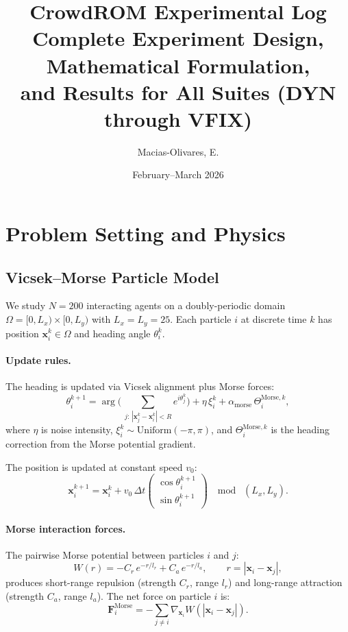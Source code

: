 \documentclass[11pt]{article}
\title{%
  \textbf{CrowdROM Experimental Log}\\[6pt]
  \large Complete Experiment Design, Mathematical Formulation,\\
  \large and Results for All Suites (DYN through VFIX)}
\author{Macias-Olivares, E.}
\date{February--March 2026}
\newcommand{\bx}{\mathbf{x}}
\begin{document}
\maketitle
\tableofcontents
\newpage


\section{Problem Setting and Physics}
\label{sec:physics}

\subsection{Vicsek--Morse Particle Model}

We study $N = 200$ interacting agents on a doubly-periodic domain
$\Omega = [0, L_x) \times [0, L_y)$ with $L_x = L_y = 25$.
Each particle $i$ at discrete time $k$ has position
$\bx_i^k \in \Omega$ and heading angle $\theta_i^k$.

\paragraph{Update rules.}
The heading is updated via Vicsek alignment plus Morse forces:
\begin{equation}\label{eq:heading}
  \theta_i^{k+1}
  = \arg\!\biggl(\,
    \sum_{j:\,|\bx_j^k - \bx_i^k| < R}
    e^{i\theta_j^k}\biggr)
  + \eta\,\xi_i^k
  + \alpha_{\text{morse}}\,\Theta_i^{\text{Morse}, k},
\end{equation}
where $\eta$ is noise intensity, $\xi_i^k \sim \text{Uniform}(-\pi, \pi)$,
and $\Theta_i^{\text{Morse},k}$ is the heading correction from
the Morse potential gradient.

The position is updated at constant speed $v_0$:
\begin{equation}
  \bx_i^{k+1} = \bx_i^k + v_0\,\Delta t
  \begin{pmatrix}\cos\theta_i^{k+1}\\\sin\theta_i^{k+1}\end{pmatrix}
  \;\mod\;(L_x, L_y).
\end{equation}

\paragraph{Morse interaction forces.}
The pairwise Morse potential between particles $i$ and $j$:
\begin{equation}
  W(r) = -C_r\,e^{-r/l_r} + C_a\,e^{-r/l_a},
  \qquad r = |\bx_i - \bx_j|,
\end{equation}
produces short-range repulsion (strength $C_r$, range $l_r$) and
long-range attraction (strength $C_a$, range $l_a$).
The net force on particle $i$ is:
\begin{equation}
  \mathbf{F}_i^{\text{Morse}} = -\sum_{j \ne i} \nabla_{\bx_i} W(|\bx_i - \bx_j|).
\end{equation}
\end{document}
